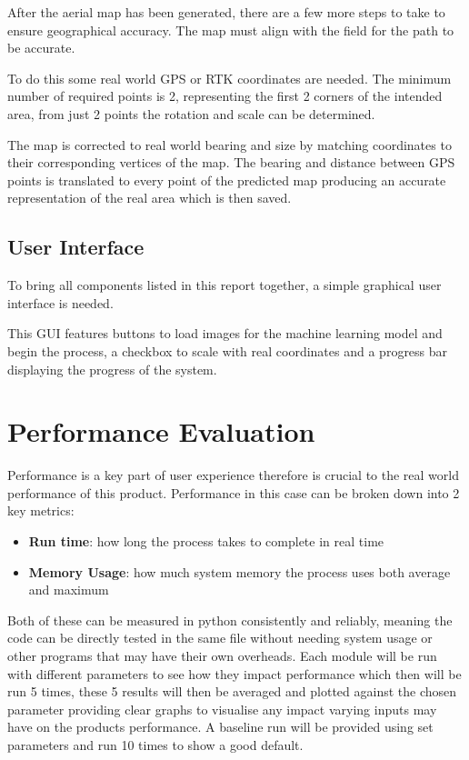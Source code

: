 \documentclass[final]{cmpreport_02}
\begin{document}
After the aerial map has been generated, there are a few more steps to take to ensure geographical accuracy.
The map must align with the field for the path to be accurate.

To do this some real world GPS or RTK coordinates are needed.
The minimum number of required points is 2, representing the first 2 corners of the intended area, from just 2 points the rotation and scale can be determined.

The map is corrected to real world bearing and size by matching coordinates to their corresponding vertices of the map.
The bearing and distance between GPS points is translated to every point of the predicted map producing an accurate representation of the real area which is then saved.


\subsection{User Interface}
To bring all components listed in this report together, a simple graphical user interface is needed.

This GUI features buttons to load images for the machine learning model and begin the process, a checkbox to scale with real coordinates and a progress bar displaying the progress of the system.

\section{Performance Evaluation}

Performance is a key part of user experience therefore is crucial to the real world performance of this product.
Performance in this case can be broken down into 2 key metrics:

\begin{itemize}
	\item{\textbf{Run time}: how long the process takes to complete in real time}
	\item{\textbf{Memory Usage}: how much system memory the process uses both average and maximum}
\end{itemize}

Both of these can be measured in python consistently and reliably, meaning the code can be directly tested in the same file without needing system usage or other programs that may have their own overheads.
Each module will be run with different parameters to see how they impact performance which then will be run 5 times,
these 5 results will then be averaged and plotted against the chosen parameter providing clear graphs to visualise any impact varying inputs may have on the products performance.
A baseline run will be provided using set parameters and run 10 times to show a good default.
\end{document}

